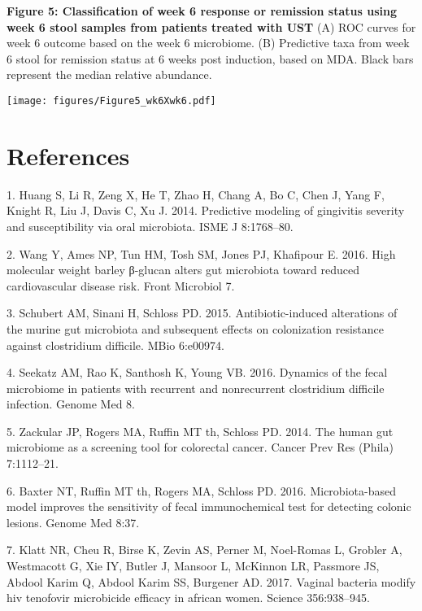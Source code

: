 \documentclass[12pt,]{article}
\begin{document}
\newpage

\textbf{Figure 5: Classification of week 6 response or remission status
using week 6 stool samples from patients treated with UST} (A) ROC
curves for week 6 outcome based on the week 6 microbiome. (B) Predictive
taxa from week 6 stool for remission status at 6 weeks post induction,
based on MDA. Black bars represent the median relative abundance.

\texttt{[image: figures/Figure5\_wk6Xwk6.pdf]}

\newpage

\section*{References}\label{references}

\hypertarget{refs}{}
\hypertarget{ref-Huang_gingivitis_2014}{}
1. Huang S, Li R, Zeng X, He T, Zhao H, Chang A, Bo C, Chen J, Yang F,
Knight R, Liu J, Davis C, Xu J. 2014. Predictive modeling of gingivitis
severity and susceptibility via oral microbiota. ISME J 8:1768--80.

\hypertarget{ref-Wang_cvdrisk_2016}{}
2. Wang Y, Ames NP, Tun HM, Tosh SM, Jones PJ, Khafipour E. 2016. High
molecular weight barley β-glucan alters gut microbiota toward reduced
cardiovascular disease risk. Front Microbiol 7.

\hypertarget{ref-Schubert_cdiff_2015}{}
3. Schubert AM, Sinani H, Schloss PD. 2015. Antibiotic-induced
alterations of the murine gut microbiota and subsequent effects on
colonization resistance against clostridium difficile. MBio 6:e00974.

\hypertarget{ref-Seekatz_cdiff_2016}{}
4. Seekatz AM, Rao K, Santhosh K, Young VB. 2016. Dynamics of the fecal
microbiome in patients with recurrent and nonrecurrent clostridium
difficile infection. Genome Med 8.

\hypertarget{ref-zackular_CRC_2014}{}
5. Zackular JP, Rogers MA, Ruffin MT th, Schloss PD. 2014. The human gut
microbiome as a screening tool for colorectal cancer. Cancer Prev Res
(Phila) 7:1112--21.

\hypertarget{ref-baxter_FIT_2016}{}
6. Baxter NT, Ruffin MT th, Rogers MA, Schloss PD. 2016.
Microbiota-based model improves the sensitivity of fecal immunochemical
test for detecting colonic lesions. Genome Med 8:37.

\hypertarget{ref-Klatt_microbicide_2017}{}
7. Klatt NR, Cheu R, Birse K, Zevin AS, Perner M, Noel-Romas L, Grobler
A, Westmacott G, Xie IY, Butler J, Mansoor L, McKinnon LR, Passmore JS,
Abdool Karim Q, Abdool Karim SS, Burgener AD. 2017. Vaginal bacteria
modify hiv tenofovir microbicide efficacy in african women. Science
356:938--945.
\end{document}
